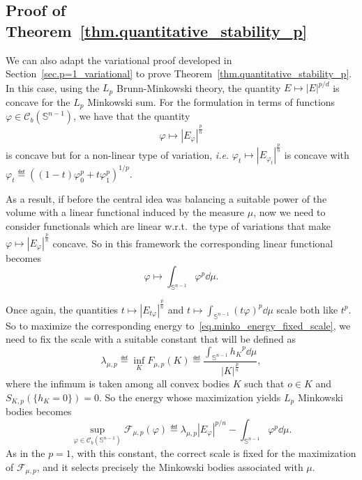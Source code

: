 \documentclass[a4paper, 10pt, twoside]{amsart}
\numberwithin{equation}{section}
\theoremstyle{plain}
\theoremstyle{definition}
\begin{document}


\subsection{Proof of Theorem~\ref{thm.quantitative_stability_p} %
}

We can also adapt the variational proof developed in Section~\ref{sec.p=1_variational} to prove Theorem~\ref{thm.quantitative_stability_p}. In this case, using the $L_p$ Brunn-Minkowski theory, the quantity $E \mapsto {|E|}^{p/d}$ is concave for the $L_p$ Minkowski sum. For the formulation in terms of functions $\varphi \in \mathscr{C}_b(\mathbb{S}^{n-1})$, we have that the quantity 
\[
    \varphi \mapsto {|E_\varphi|}^{\frac{p}{n}}
\]
is concave but for a non-linear type of variation, \textit{i.e.} $\varphi_t \mapsto {|E_{\varphi_t}|}^{\frac{p}{n}}$ is concave with $\varphi_t \eqdef {\left((1-t)\varphi_0^p + t \varphi_1^p\right)}^{1/p}$. 

As a result, if before the central idea was balancing a suitable power of the volume with a linear functional induced by the measure $\mu$, now we need to consider functionals which are linear w.r.t.~the type of variations that make $\varphi \mapsto {|E_\varphi|}^{\frac{p}{n}}$ concave. So in this framework the corresponding linear functional becomes
\[
    \varphi \mapsto \int_{\mathbb{S}^{n-1}} \varphi^p \dd \mu.
\]

Once again, the quantities $t \mapsto {|E_{t\varphi}|}^{\frac{p}{n}}$ and $t \mapsto \int_{\mathbb{S}^{n-1}} {(t\varphi)}^p \dd \mu$ scale both like $t^p$. So to maximize the corresponding energy to~\eqref{eq.minko_energy_fixed_scale}, we need to fix the scale with a suitable constant that will be defined as 
\begin{equation}
    \lambda_{\mu,p} 
    \eqdef 
    \inf_{K} 
    F_{\mu,p}(K) 
    \eqdef
    \frac{
        \displaystyle 
        \int_{\mathbb{S}^{n-1}} {h_K}^p \dd \mu
    }{
        |K|^{\frac{p}{n}}
    },
\end{equation}
where the infimum is taken among all convex bodies $K$ such that $o \in K$ and $S_{K,p}(\{h_K = 0\}) = 0$. So the energy whose maximization yields $L_p$ Minkowski bodies becomes
\begin{equation}\label{eq.prob_L_pMinkowski}
    \sup_{\varphi \in \mathscr{C}_b(\mathbb{S}^{n-1})} 
    \mathscr{F}_{\mu,p}(\varphi) 
    \eqdef 
    \lambda_{\mu,p}
    {|E_{\varphi}|}^{p/n}
    -
    \int_{\mathbb{S}^{n-1}} \varphi^p \dd \mu. 
\end{equation}
As in the $p = 1$, with this constant, the correct scale is fixed for the maximization of $\mathscr{F}_{\mu,p}$, and it selects precisely the Minkowski bodies associated with $\mu$.
\end{document}
